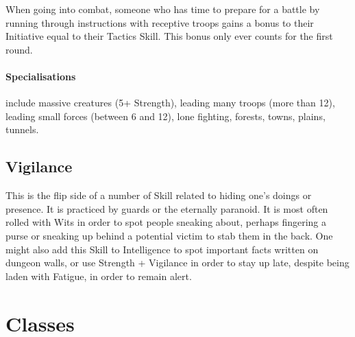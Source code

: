 \documentclass[titlepage,a4paper,openany]{book}
\begin{document}
\begin{multicols}{2}
When going into combat, someone who has time to prepare for a battle by running through instructions with receptive troops gains a bonus to their Initiative equal to their Tactics Skill. This bonus only ever counts for the first \gls{round}.

\paragraph{Specialisations} include massive creatures (5+ Strength), leading many troops (more than 12), leading small forces (between 6 and 12), lone fighting, forests, towns, plains, tunnels.

\subsection{Vigilance}

This is the flip side of a number of Skill related to hiding one's doings or presence.
It is practiced by guards or the eternally paranoid.
It is most often rolled with Wits in order to spot people sneaking about, perhaps fingering a purse or sneaking up behind a potential victim to stab them in the back.
One might also add this Skill to Intelligence to spot important facts written on dungeon walls, or use Strength + Vigilance in order to stay up late, despite being laden with Fatigue, in order to remain alert.

\end{multicols}

\section{Classes}
\end{document}
